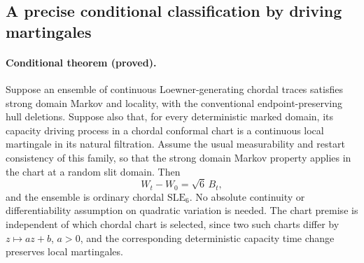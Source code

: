 \documentclass[11pt]{article}
\theoremstyle{definition}\newtheorem{definition}[theorem]{Definition}
\theoremstyle{remark}\newtheorem{remark}[theorem]{Remark}
\begin{document}
\subsection{A precise conditional classification by driving martingales}

\paragraph{Conditional theorem (proved).}
\leavevmode\par\noindent
Suppose an ensemble of continuous Loewner-generating chordal traces satisfies
strong domain Markov and locality, with the conventional endpoint-preserving
hull deletions.  Suppose also that, for every deterministic marked domain,
its capacity driving process in a chordal conformal chart is a continuous
local martingale in its natural filtration.  Assume the usual measurability
and restart consistency of this family, so that the strong domain Markov
property applies in the chart at a random slit domain.  Then
\[
 W_t-W_0=\sqrt6\,B_t,
\]
and the ensemble is ordinary chordal $\mathrm{SLE}_6$.
No absolute continuity or differentiability assumption on quadratic
variation is needed.  The chart premise is independent of which chordal
chart is selected, since two such charts differ by $z\mapsto az+b$, $a>0$,
and the corresponding deterministic capacity time change preserves local
martingales.
\end{document}
